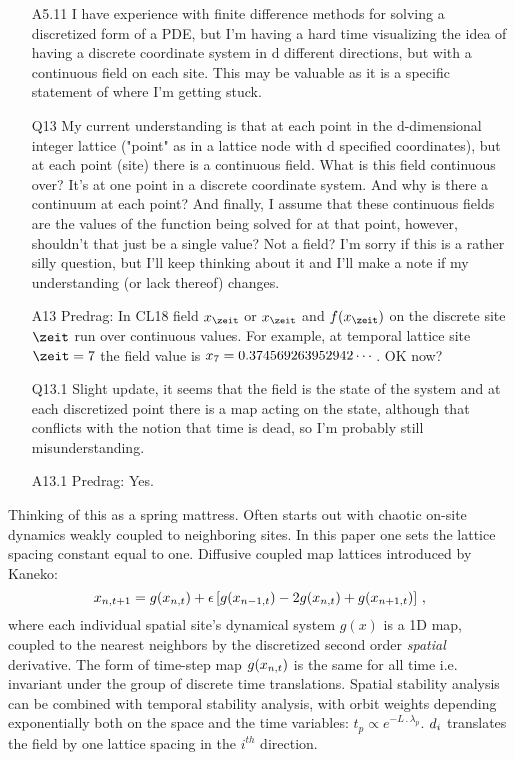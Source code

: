\begin{description}
\begin{itemize}
	\item[A5.11]
I have experience with finite difference methods for solving a
discretized form of a PDE, but I'm having a hard time visualizing the
idea of having a discrete coordinate system in d different directions,
but with a continuous field on each site. This  may be valuable as it is
a specific statement of where I'm getting stuck.
	\item[Q13]
My current understanding is
that at each point in the d-dimensional integer lattice ("point" as in a
lattice node with d specified coordinates), but at each point (site)
there is a continuous field. What is this field continuous over? It's at
one point in a discrete coordinate system. And why is there a continuum
at each point? And finally, I assume that these continuous fields are the
values of the function being solved for at that point, however, shouldn't
that just be a single value? Not a field? I'm sorry if this is a rather
silly question, but I'll keep thinking about it and I'll make a note if
my understanding (or lack thereof) changes.
	\item[A13]
Predrag: In CL18  field $x_\zeit$ or $\ssp_\zeit$ and
$f(\ssp_\zeit)$  on the discrete site $\zeit$ run over continuous values.
For example, at temporal lattice site $\zeit=7$ the field value is
$x_7=0.374569263952942\cdots$. OK now?
	\item[Q13.1]
Slight update, it seems that the field is the state of the system and at each discretized point there is a map acting on the state, although that conflicts with the notion that time is dead, so I'm probably still misunderstanding.
	\item[A13.1]
Predrag: Yes.
\end{itemize}
Thinking of this as a spring mattress. Often starts out with chaotic on-site dynamics weakly coupled to neighboring sites.
In this paper one sets the lattice spacing constant equal to one. Diffusive coupled map lattices introduced by Kaneko:
\[
x_{n,t+1}=
g(x_{n,t})+\epsilon\left[g(x_{n-1,t})-2g(x_{n,t})+g(x_{n+1,t})\right]
\,,
\]
where each individual spatial site's dynamical system $g(x)$ is a 1D map, coupled to the nearest neighbors by the discretized second order \emph{spatial} derivative. The form of time-step map $g(x_{n,t})$ is the same for all time i.e. invariant under the group of discrete time translations. Spatial stability analysis can be combined with temporal stability analysis, with orbit weights depending exponentially both on the space and the time variables: $t_p\propto e^{-L\period{}\lambda_p}$. $d_i$ translates the field by one lattice spacing in the $i^{th}$ direction.

\end{description}
